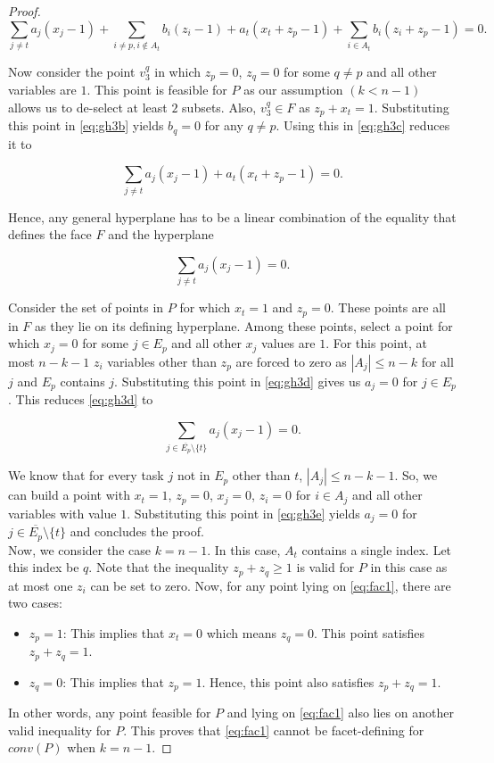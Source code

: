 \documentclass[12pt]{article}
\renewcommand{\v}[1]{\overline{#1}}
\begin{document}
\begin{proof}
\begin{equation}
\sum_{j \neq t} a_j (x_j - 1) + \sum_{i \neq p,i \notin A_t} b_i (z_i - 1) + a_t(x_t + z_p - 1) + \sum_{i \in A_t} b_i (z_i + z_p - 1) = 0.
\label{eq:gh3c}
\end{equation}

Now consider the point $v_3^q$ in which $z_p = 0$, $z_q = 0$ for some $q \neq p$ and all other variables are $1$. This point is feasible for $P$ as our assumption $(k<n-1)$ allows us to de-select at least $2$ subsets. Also, $v_3^q \in F$ as $z_p + x_t = 1$. Substituting this point in \eqref{eq:gh3b} yields $b_q = 0$ for any $q \neq p$. Using this in \eqref{eq:gh3c} reduces it to

\[ \sum_{j \neq t} a_j (x_j - 1) + a_t (x_t + z_p - 1) = 0. \]

Hence, any general hyperplane has to be a linear combination of the equality that defines the face $F$ and the hyperplane

\begin{equation}
\sum_{j \neq t} a_j (x_j - 1) = 0.
\label{eq:gh3d}
\end{equation}

Consider the set of points in $P$ for which $x_t=1$ and $z_p=0$. These points are all in $F$ as they lie on its defining hyperplane. Among these points, select a point for which $x_j = 0$ for some $j \in E_p$ and all other $x_j$ values are $1$. For this point, at most $n-k-1$ $z_i$ variables other than $z_p$ are forced to zero as $|A_j| \leq n-k$ for all $j$ and $E_p$ contains $j$. Substituting this point in \eqref{eq:gh3d} gives us $a_j = 0$ for $j \in E_p$. This reduces \eqref{eq:gh3d} to

\begin{equation}
\sum_{j \in \v{E_p} \setminus \{t\}} a_j (x_j - 1) = 0.
\label{eq:gh3e}
\end{equation}

We know that for every task $j$ not in $E_p$ other than $t$, $|A_j| \leq n-k-1$. So, we can build a point with $x_t = 1$, $z_p = 0$, $x_j = 0$, $z_i=0$ for $i \in A_j$ and all other variables with value $1$. Substituting this point in \eqref{eq:gh3e} yields $a_j=0$ for $j \in \v{E_p} \setminus \{t\}$ and concludes the proof.\\

Now, we consider the case $k = n-1$. In this case, $A_t$ contains a single index. Let this index be $q$. Note that the inequality $z_p + z_q \geq 1$ is valid for $P$ in this case as at most one $z_i$ can be set to zero. Now, for any point lying on \eqref{eq:fac1}, there are two cases:
\begin{itemize}
\item $z_p = 1$: This implies that $x_t = 0$ which means $z_q = 0$. This point satisfies $z_p + z_q = 1$.
\item $z_q = 0$: This implies that $z_p = 1$. Hence, this point also satisfies $z_p + z_q = 1$.
\end{itemize}
In other words, any point feasible for $P$ and lying on \eqref{eq:fac1} also lies on another valid inequality for $P$. This proves that \eqref{eq:fac1} cannot be facet-defining for $conv(P)$ when $k = n-1$.
\end{proof}
\end{document}
